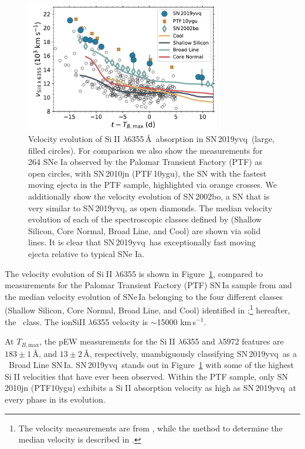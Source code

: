 \documentclass[twocolumn]{aastex63}
\def\ion#1#2{#1$\;${\footnotesize\rm{#2}}\relax}
\newcommand{\tbmax}{$T_{B,\mathrm{max}}$}
\newcommand{\kms}{km\,s$^{-1}$}
\newcommand{\sn}{SN\,2019yvq}
\begin{document}
\begin{figure}
    \centering
    \includegraphics[width=3.35in]{./figures/vel_evolution.pdf}
    \caption{Velocity evolution of \ion{Si}{II} $\lambda$6355\,\AA\ absorption
    in \sn\ (large, filled circles). For comparison we also show the
    measurements for 264 SNe Ia observed by the Palomar Transient Factory
    (PTF) as open circles, with SN\,2010jn (PTF\,10ygu), the SN with the
    fastest moving ejecta in the PTF sample, highlighted via orange crosses.
    We additionally show the velocity evolution of SN\,2002bo, a SN that is
    very similar to \sn, as open diamonds. The median velocity evolution of
    each of the spectroscopic classes defined by \citet{Branch06} (Shallow
    Silicon, Core Normal, Broad Line, and Cool) are shown via solid lines. It
    is clear that \sn\ has exceptionally fast moving ejecta relative to
    typical SNe Ia.}
    \label{fig:vel_evo}
\end{figure}

The velocity evolution of \ion{Si}{II} $\lambda$6355 is shown in
Figure~\ref{fig:vel_evo}, compared to measurements for the Palomar Transient
Factory (PTF) SN\,Ia sample from \citet{Maguire14} and the median velocity
evolution of SNe\,Ia belonging to the four different classes (Shallow Silicon,
Core Normal, Broad Line, and Cool) identified in
\citet{Branch06};\footnote{The velocity measurements are from
\citet{Blondin12}, while the method to determine the median velocity is
described in \citet{Miller18}.} hereafter, the \citeauthor{Branch06}~class. 
The ion{Si}{II} $\lambda$6355 velocity is $\sim$15000 \kms.  

At \tbmax, the pEW measurements for the \ion{Si}{II} $\lambda$6355 and
$\lambda$5972 features are $183\pm1$\,\AA, and $13\pm2$\,\AA, respectively,
unambiguously classifying \sn\ as a \citeauthor{Branch06}~Broad Line SN\,Ia.
\sn\ stands out in Figure~\ref{fig:vel_evo} with some of the highest
\ion{Si}{II} velocities that have ever been observed. Within the PTF sample,
only SN\,2010jn (PTF10ygu) exhibits a \ion{Si}{II} absorption velocity as high
as \sn\ at every phase in its evolution.
\end{document}
